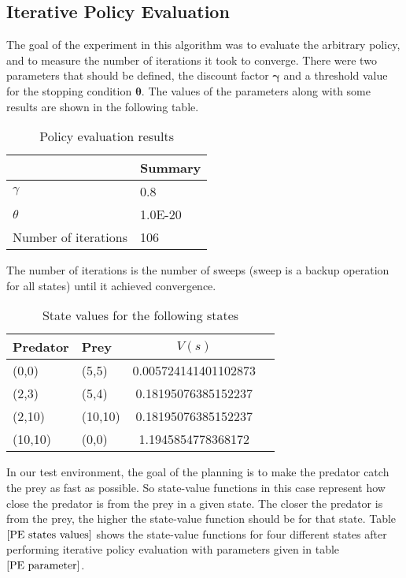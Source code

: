 \documentclass[paper=a4, fontsize=11pt]{scrartcl}
\numberwithin{equation}{section}		%
\numberwithin{figure}{section}			%
\numberwithin{table}{section}				%
\begin{document}
\subsection{Iterative Policy Evaluation}
The goal of the experiment in this algorithm was to evaluate the arbitrary policy, and to measure the number of iterations it took to converge. There were two parameters that should be defined, the discount factor $\mathbf{\gamma}$ and a threshold value for the stopping condition $\mathbf{\theta}$. The values of the parameters along with some results are shown in the following table.
\begin{table}[H]
\caption{Policy evaluation results}
\label{PE parameter}
\centering
    \begin{tabular}{| l || l |}
    \hline
      & Summary \\ \hline
    $\gamma$ & 0.8 \\ \hline
    $\theta$ & 1.0E-20 \\ \hline
    Number of iterations & 106 \\
    \hline
    \end{tabular} 
\end{table}
The number of iterations is the number of sweeps (sweep is a backup operation for all states) until it achieved convergence.
\begin{table}[H]
\caption{State values for the following states}
\label{PE states values}
\centering
\begin{tabular}{| l  |  l || c | r |}
  \hline
  Predator & Prey & $V(s)$ \\ \hline
  (0,0) & (5,5) & 0.005724141401102873 \\ \hline
  (2,3) & (5,4) & 0.18195076385152237 \\ \hline
  (2,10) & (10,10) & 0.18195076385152237 \\ \hline
  (10,10) & (0,0) & 1.1945854778368172 \\
  \hline  
\end{tabular}
\end{table}
In our test environment, the goal of the planning is to make the predator catch the prey as fast as possible. So state-value functions in this case represent how close the predator is from the prey in a given state. The closer the predator is from the prey, the higher the state-value function should be for that state. Table $\ref{PE states values}$ shows the state-value functions for four different states after performing iterative policy evaluation with parameters given in table $\ref{PE parameter}$.
\end{document}
